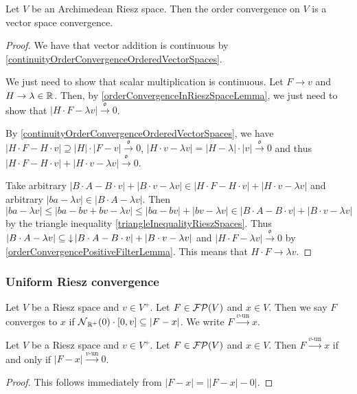 \begin{proposition}
Let $V$ be an Archimedean Riesz space. Then the order convergence on $V$ is a vector space convergence.
\end{proposition}
\begin{proof}
We have that vector addition is continuous by \ref{continuityOrderConvergenceOrderedVectorSpaces}.

We just need to show that scalar multiplication is continuous. Let $F\to v$ and $H \to \lambda\in \mathbb{R}$. Then, by \ref{orderConvergenceInRieszSpaceLemma}, we just need to show that $|H\cdot F - \lambda v|\overset{\mathfrak{o}}{\longrightarrow} 0$.

By \ref{continuityOrderConvergenceOrderedVectorSpaces}, we have $|H\cdot F - H\cdot v| \supseteq |H|\cdot |F-v| \overset{\mathfrak{o}}{\longrightarrow} 0$, $|H\cdot v - \lambda v| = |H-\lambda|\cdot |v| \overset{\mathfrak{o}}{\longrightarrow} 0$ and thus $|H\cdot F - H\cdot v| + |H\cdot v - \lambda v| \overset{\mathfrak{o}}{\longrightarrow} 0$.

Take arbitrary $|B\cdot A - B\cdot v| + |B\cdot v - \lambda v| \in |H\cdot F - H\cdot v| + |H\cdot v - \lambda v|$ and arbitrary $|ba - \lambda v| \in |B\cdot A - \lambda v|$. Then
\[ |ba - \lambda v| \leq |ba - bv + bv - \lambda v| \leq |ba - bv| + |bv - \lambda v| \in |B\cdot A - B\cdot v| + |B\cdot v - \lambda v| \]
by the triangle inequality \ref{triangleInequalityRieszSpaces}. Thus $|B\cdot A - \lambda v| \subseteq \operatorname{\downarrow} |B\cdot A - B\cdot v| + |B\cdot v - \lambda v|$ and $|H\cdot F - \lambda v| \overset{\mathfrak{o}}{\longrightarrow} 0$ by \ref{orderConvergencePositiveFilterLemma}. This means that $H\cdot F \to \lambda v$.
\end{proof}

\subsubsection{Uniform Riesz convergence}
\begin{definition}
Let $V$ be a Riesz space and $v\in V^+$. Let $F\in \operatorname{\mathcal{FP}}(V)$ and $x\in V$. Then we say $F$ converges  to $x$ if $\neighbourhood_{\R^+}(0)\cdot \interval{0,v} \subseteq |F - x|$. We write $F\overset{\text{$v$-un}}{\longrightarrow} x$.
\end{definition}

\begin{lemma} \label{uniformRieszConvergenceAbsoluteValueConvergenceLemma}
Let $V$ be a Riesz space and $v\in V^+$. Let $F\in \operatorname{\mathcal{FP}}(V)$ and $x\in V$. Then $F\overset{\text{$v$-un}}{\longrightarrow} x$ \textup{if and only if} $|F-x|\overset{\text{$v$-un}}{\longrightarrow} 0$.
\end{lemma}
\begin{proof}
This follows immediately from $|F-x| = \big||F-x|-0\big|$.
\end{proof}

